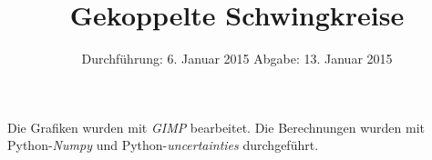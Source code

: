 
\usepackage{marvosym}
\subject{Anfängerpraktikum V355}
\title{Gekoppelte Schwingkreise
}
\date{
  Durchführung: 6. Januar 2015
  \hspace{1em}
  Abgabe: 13. Januar 2015
}


\maketitle
\thispagestyle{empty}
\newpage





\printbibliography
Die Grafiken wurden mit \textit{GIMP}\cite{gimp} bearbeitet.
Die Berechnungen wurden mit Python-\textit{Numpy} \cite{numpy} und Python-\textit{uncertainties} \cite{uncertainties} durchgeführt.

